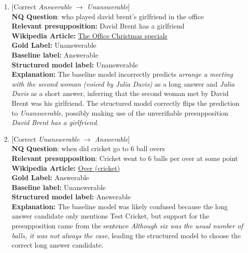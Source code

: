 \documentclass[11pt,a4paper]{article}
\begin{document}
\begin{enumerate}
    \item {[Correct \textit{Answerable} $\rightarrow$ \textit{Unanswerable}]} \\ 
    \textbf{NQ Question}: who played david brent's girlfriend in the office \\
    \textbf{Relevant presupposition:} David Brent has a girlfriend \\
    \textbf{Wikipedia Article:} \href{https://en.wikipedia.org/wiki/The_Office_Christmas_specials}{The Office Christmas specials} \\
    \textbf{Gold Label:} Unanswerable \\
    \textbf{Baseline label:} Answerable \\
    \textbf{Structured model label:} Unanswerable \\
    \textbf{Explanation:} The baseline model incorrectly predicts \textit{arrange a meeting with the second woman (voiced by Julia Davis)} as a long answer and \textit{Julia Davis} as a short answer, inferring that the second woman met by David Brent was his girlfriend. The structured model correctly flips the prediction to \textit{Unanswerable}, possibly making use of the unverifiable presupposition \textit{David Brent has a girlfriend}.

    \item  {[Correct \textit{Unanswerable} $\rightarrow$ \textit{Answerable}]} \\
    \textbf{NQ Question}: when did cricket go to 6 ball overs \\
    \textbf{Relevant presupposition}: Cricket went to 6 balls per over at some point \\
    \textbf{Wikipedia Article:} \href{https://en.wikipedia.org/wiki/Over_(cricket)}{Over (cricket)} \\
    \textbf{Gold Label:} Answerable \\
    \textbf{Baseline label:} Unanswerable \\
    \textbf{Structured model label:} Answerable \\
    \textbf{Explanation:} The baseline model was likely confused because the long answer candidate only mentions Test Cricket, but support for the presupposition came from the sentence \textit{Although six was the usual number of balls, it was not always the case}, leading the structured model to choose the correct long answer candidate.


\end{enumerate}
\end{document}
